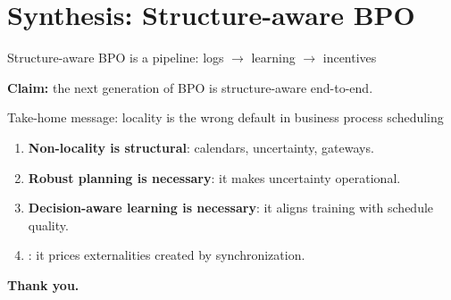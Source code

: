 \documentclass[aspectratio=169,10pt]{beamer}
\newif\iflong
\newcommand{\btext}[1]{\textbf{\color{darkred}#1}}
\begin{document}
\section{Synthesis: Structure-aware BPO}

\begin{frame}{Structure-aware BPO is a pipeline: logs \(\rightarrow\) learning \(\rightarrow\) incentives}
  \begin{center}
  \end{center}
  \vspace{0.1cm}
  \btext{Claim:} the next generation of BPO is structure-aware end-to-end.
\end{frame}

\begin{frame}{Take-home message: locality is the wrong default in business process scheduling}
  \begin{enumerate}
    \item \btext{Non-locality is structural}: calendars, uncertainty, gateways.
    \item \btext{Robust planning is necessary}: it makes uncertainty operational.
    \item \btext{Decision-aware learning is necessary}: it aligns training with schedule quality.
    \item \iflong\btext{Valuation is the capstone}: it prices externalities and enables neutrality with efficiency.\else{}: it prices externalities created by synchronization.\fi
  \end{enumerate}
  \vspace{0.25cm}
  \btext{Thank you.}
\end{frame}
\end{document}
